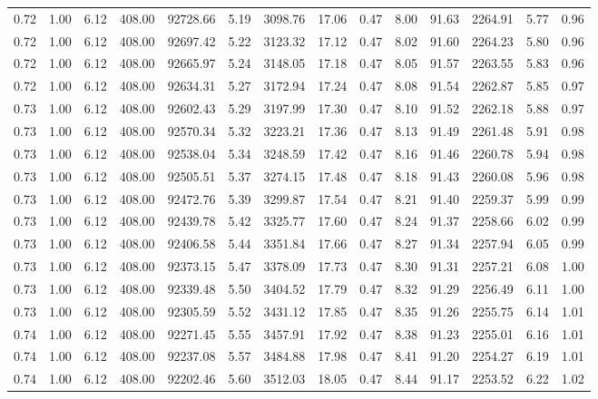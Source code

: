 \begin{table}[!ht]
\begin{tabular}{rrrrrrrrrrrrrr}
0.72 & 1.00 & 6.12 & 408.00 & 92728.66 & 5.19 & 3098.76 & 17.06 & 0.47 & 8.00 & 91.63 & 2264.91 & 5.77 & 0.96 \\
0.72 & 1.00 & 6.12 & 408.00 & 92697.42 & 5.22 & 3123.32 & 17.12 & 0.47 & 8.02 & 91.60 & 2264.23 & 5.80 & 0.96 \\
0.72 & 1.00 & 6.12 & 408.00 & 92665.97 & 5.24 & 3148.05 & 17.18 & 0.47 & 8.05 & 91.57 & 2263.55 & 5.83 & 0.96 \\
0.72 & 1.00 & 6.12 & 408.00 & 92634.31 & 5.27 & 3172.94 & 17.24 & 0.47 & 8.08 & 91.54 & 2262.87 & 5.85 & 0.97 \\
0.73 & 1.00 & 6.12 & 408.00 & 92602.43 & 5.29 & 3197.99 & 17.30 & 0.47 & 8.10 & 91.52 & 2262.18 & 5.88 & 0.97 \\
0.73 & 1.00 & 6.12 & 408.00 & 92570.34 & 5.32 & 3223.21 & 17.36 & 0.47 & 8.13 & 91.49 & 2261.48 & 5.91 & 0.98 \\
0.73 & 1.00 & 6.12 & 408.00 & 92538.04 & 5.34 & 3248.59 & 17.42 & 0.47 & 8.16 & 91.46 & 2260.78 & 5.94 & 0.98 \\
0.73 & 1.00 & 6.12 & 408.00 & 92505.51 & 5.37 & 3274.15 & 17.48 & 0.47 & 8.18 & 91.43 & 2260.08 & 5.96 & 0.98 \\
0.73 & 1.00 & 6.12 & 408.00 & 92472.76 & 5.39 & 3299.87 & 17.54 & 0.47 & 8.21 & 91.40 & 2259.37 & 5.99 & 0.99 \\
0.73 & 1.00 & 6.12 & 408.00 & 92439.78 & 5.42 & 3325.77 & 17.60 & 0.47 & 8.24 & 91.37 & 2258.66 & 6.02 & 0.99 \\
0.73 & 1.00 & 6.12 & 408.00 & 92406.58 & 5.44 & 3351.84 & 17.66 & 0.47 & 8.27 & 91.34 & 2257.94 & 6.05 & 0.99 \\
0.73 & 1.00 & 6.12 & 408.00 & 92373.15 & 5.47 & 3378.09 & 17.73 & 0.47 & 8.30 & 91.31 & 2257.21 & 6.08 & 1.00 \\
0.73 & 1.00 & 6.12 & 408.00 & 92339.48 & 5.50 & 3404.52 & 17.79 & 0.47 & 8.32 & 91.29 & 2256.49 & 6.11 & 1.00 \\
0.73 & 1.00 & 6.12 & 408.00 & 92305.59 & 5.52 & 3431.12 & 17.85 & 0.47 & 8.35 & 91.26 & 2255.75 & 6.14 & 1.01 \\
0.74 & 1.00 & 6.12 & 408.00 & 92271.45 & 5.55 & 3457.91 & 17.92 & 0.47 & 8.38 & 91.23 & 2255.01 & 6.16 & 1.01 \\
0.74 & 1.00 & 6.12 & 408.00 & 92237.08 & 5.57 & 3484.88 & 17.98 & 0.47 & 8.41 & 91.20 & 2254.27 & 6.19 & 1.01 \\
0.74 & 1.00 & 6.12 & 408.00 & 92202.46 & 5.60 & 3512.03 & 18.05 & 0.47 & 8.44 & 91.17 & 2253.52 & 6.22 & 1.02 \\

\end{tabular}
\end{table}
